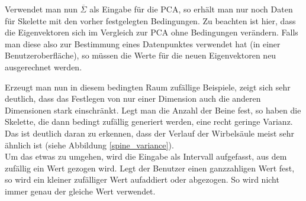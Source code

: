  Verwendet man nun $\overline{\Sigma}$ als Eingabe für die PCA, so erhält man nur noch Daten für Skelette mit den vorher festgelegten Bedingungen. Zu beachten ist hier, dass die Eigenvektoren sich im Vergleich zur PCA ohne Bedingungen verändern. Falls man diese also zur Bestimmung eines Datenpunktes verwendet hat (\zb in einer Benutzeroberfläche), so müssen die Werte für die neuen Eigenvektoren neu ausgerechnet werden.
 
 Erzeugt man nun in diesem bedingten Raum zufällige Beispiele, zeigt sich sehr deutlich, dass das Festlegen von nur einer Dimension auch die anderen Dimensionen stark einschränkt. Legt man \zb die Anzahl der Beine fest, so haben die Skelette, die dann bedingt zufällig generiert werden, eine recht geringe Varianz. Das ist deutlich daran zu erkennen, dass der Verlauf der Wirbelsäule meist sehr ähnlich ist (siehe Abbildung \ref{spine_variance}).\\
 Um das etwas zu umgehen, wird die Eingabe als Intervall aufgefasst, aus dem zufällig ein Wert gezogen wird. Legt \zb der Benutzer einen ganzzahligen Wert fest, so wird ein kleiner zufälliger Wert aufaddiert oder abgezogen. So wird nicht immer genau der gleiche Wert verwendet.
 
